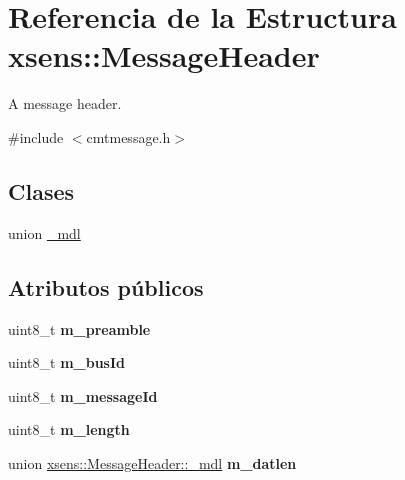 \hypertarget{structxsens_1_1MessageHeader}{\section{\-Referencia de la \-Estructura xsens\-:\-:\-Message\-Header}
\label{structxsens_1_1MessageHeader}
}


\-A message header.  




{\ttfamily \#include $<$cmtmessage.\-h$>$}

\subsection*{\-Clases}
\begin{DoxyCompactItemize}
\item 
union \hyperlink{unionxsens_1_1MessageHeader_1_1__mdl}{\-\_\-mdl}
\end{DoxyCompactItemize}
\subsection*{\-Atributos públicos}
\begin{DoxyCompactItemize}
\item 
\hypertarget{structxsens_1_1MessageHeader_a46999faafcfc06c02e8065595e9f5980}{uint8\-\_\-t {\bfseries m\-\_\-preamble}}\label{structxsens_1_1MessageHeader_a46999faafcfc06c02e8065595e9f5980}

\item 
\hypertarget{structxsens_1_1MessageHeader_adf5d5029ceaa9f9713a19916ee63222b}{uint8\-\_\-t {\bfseries m\-\_\-bus\-Id}}\label{structxsens_1_1MessageHeader_adf5d5029ceaa9f9713a19916ee63222b}

\item 
\hypertarget{structxsens_1_1MessageHeader_a42d5695a5c74c2f47a8c2d52f63febb1}{uint8\-\_\-t {\bfseries m\-\_\-message\-Id}}\label{structxsens_1_1MessageHeader_a42d5695a5c74c2f47a8c2d52f63febb1}

\item 
\hypertarget{structxsens_1_1MessageHeader_aa8999427b4315622ce76e2c22e528f92}{uint8\-\_\-t {\bfseries m\-\_\-length}}\label{structxsens_1_1MessageHeader_aa8999427b4315622ce76e2c22e528f92}

\item 
\hypertarget{structxsens_1_1MessageHeader_a924cf50df941d08350e12161593c106b}{union \hyperlink{unionxsens_1_1MessageHeader_1_1__mdl}{xsens\-::\-Message\-Header\-::\-\_\-mdl} {\bfseries m\-\_\-datlen}}\label{structxsens_1_1MessageHeader_a924cf50df941d08350e12161593c106b}

\end{DoxyCompactItemize}


